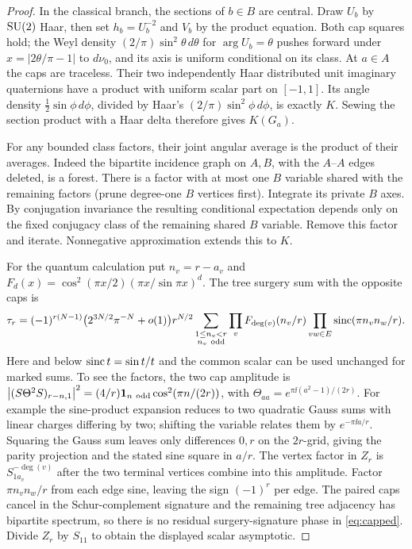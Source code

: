 \begin{proof}
In the classical branch, the sections of \(b\in B\) are central. Draw \(U_b\) by \(\mathrm{SU}(2)\) Haar, then set \(h_b=U_b^{-2}\) and \(V_b\) by the product equation. Both cap squares hold; the Weyl density \((2/\pi)\sin^2\theta\,d\theta\) for \(\arg U_b=\theta\) pushes forward under \(x=|2\theta/\pi-1|\) to \(d\nu_0\), and its axis is uniform conditional on its class. At \(a\in A\) the caps are traceless. Their two independently Haar distributed unit imaginary quaternions have a product with uniform scalar part on \([-1,1]\). Its angle density \(\tfrac12\sin\phi\,d\phi\), divided by Haar's \((2/\pi)\sin^2\phi\,d\phi\), is exactly \(K\). Sewing the section product with a Haar delta therefore gives \(K(G_a)\).

For any bounded class factors, their joint angular average is the product of their averages. Indeed the bipartite incidence graph on \(A,B\), with the \(A\)--\(A\) edges deleted, is a forest. There is a factor with at most one \(B\) variable shared with the remaining factors (prune degree-one \(B\) vertices first). Integrate its private \(B\) axes. By conjugation invariance the resulting conditional expectation depends only on the fixed conjugacy class of the remaining shared \(B\) variable. Remove this factor and iterate. Nonnegative approximation extends this to \(K\).

For the quantum calculation put \(n_v=r-a_v\) and \(F_d(x)=\cos^2(\pi x/2)(\pi x/\sin\pi x)^d\). The tree surgery sum with the opposite caps is \cite{GPPV,P48}
\begin{equation}\label{eq:capped}
 \tau_r=(-1)^{r(N-1)}
 \bigl(2^{3N/2}\pi^{-N}+o(1)\bigr)r^{N/2}
 \sum_{\substack{1\le n_v<r\\ n_v\ {\rm odd}}}
  \prod_v F_{\deg(v)}(n_v/r)\prod_{vw\in E}\operatorname{sinc}(\pi n_v n_w/r).
\end{equation}
Here and below \(\operatorname{sinc} t=\sin t/t\) and the common scalar can be used unchanged for marked sums. To see the factors, the two cap amplitude is \(\left|(S\Theta^2S)_{r-n,1}\right|^2=(4/r)\mathbf1_{n\ {\rm odd}}\cos^2(\pi n/(2r))\), with \(\Theta_{aa}=e^{\pi\ii(a^2-1)/(2r)}\). For example the sine-product expansion reduces to two quadratic Gauss sums with linear charges differing by two; shifting the variable relates them by \(e^{-\pi\ii a/r}\). Squaring the Gauss sum leaves only differences \(0,r\) on the \(2r\)-grid, giving the parity projection and the stated sine square in \(a/r\). The vertex factor in \(Z_r\) is \(S_{1a_v}^{-\deg(v)}\) after the two terminal vertices combine into this amplitude. Factor \(\pi n_v n_w/r\) from each edge sine, leaving the sign \((-1)^r\) per edge. The paired caps cancel in the Schur-complement signature and the remaining tree adjacency has bipartite spectrum, so there is no residual surgery-signature phase in \eqref{eq:capped}. Divide \(Z_r\) by \(S_{11}\) to obtain the displayed scalar asymptotic.


\end{proof}
